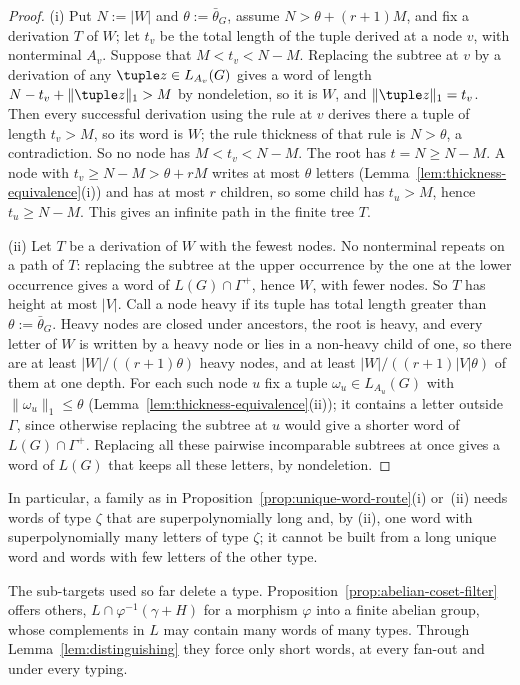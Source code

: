 \begin{proof}
(i) 
Put $N:=|W|$ and $\theta:=\bar\theta_G$, assume $N>\theta+(r+1)M$, and fix a
derivation $T$ of $W$; let $t_v$ be the total length of the tuple derived at a
node $v$, with nonterminal $A_v$.  Suppose that $M<t_v<N-M$.  Replacing the
subtree at $v$ by a derivation of any $\tuple z\in L_{A_v}(G)$ gives a word of
length $N-t_v+\|\tuple z\|_1>M$ by nondeletion, so it is $W$, and
$\|\tuple z\|_1=t_v$.  Then every successful derivation using the rule
at $v$ derives there a tuple of length $t_v>M$, so its word is $W$; the rule thickness of that rule is $N>\theta$, a contradiction.  So no node
has $M<t_v<N-M$.  The root has $t=N\ge N-M$.  A node with $t_v\ge N-M>\theta+rM$
writes at most $\theta$ letters (Lemma~\ref{lem:thickness-equivalence}(i)) and has
at most $r$ children, so some child has $t_u>M$, hence $t_u\ge N-M$.  This gives
an infinite path in the finite tree $T$.

(ii) Let $T$ be a derivation of $W$ with the fewest nodes.  No nonterminal
repeats on a path of $T$: replacing the subtree at the upper occurrence by the one
at the lower occurrence gives a word of $L(G)\cap\Gamma^+$, hence $W$, with fewer
nodes.  So
$T$ has height at most $|V|$.  Call a node heavy if its tuple has total length
greater than $\theta:=\bar\theta_G$.  Heavy nodes are closed under ancestors, the
root is heavy, and every letter of $W$ is written by a heavy node or lies in a
non-heavy child of one, so there are at least $|W|/((r+1)\theta)$ heavy nodes,
and at least $|W|/((r+1)|V|\theta)$ of them at one depth.  For each such node $u$
fix a tuple $\omega_u\in L_{A_u}(G)$ with $\|\omega_u\|_1\le\theta$
(Lemma~\ref{lem:thickness-equivalence}(ii)); it contains a letter outside
$\Gamma$, since otherwise replacing the subtree at $u$ would give a shorter word of
$L(G)\cap\Gamma^+$.
Replacing all these pairwise incomparable subtrees at once gives a word of $L(G)$
that keeps all these letters, by nondeletion.
\end{proof}

In particular, a family as in Proposition~\ref{prop:unique-word-route}(i)
or~(ii) needs words of type $\zeta$ that are superpolynomially long and, by (ii),
one word with superpolynomially many letters of type $\zeta$; it cannot be built
from a long unique word and words with few letters of the other type.

The sub-targets used so far delete a type.  Proposition~\ref{prop:abelian-coset-filter}
offers others, $L\cap\varphi^{-1}(\gamma+H)$ for a morphism $\varphi$ into a finite
abelian group, whose complements in $L$ may contain many words of many types.
Through Lemma~\ref{lem:distinguishing} they force only short words, at every
fan-out and under every typing.

